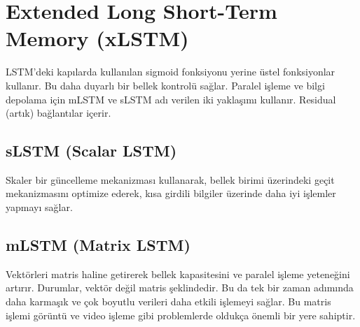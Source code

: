 \section{Extended Long Short-Term Memory (xLSTM)}
LSTM'deki kapılarda kullanılan sigmoid fonksiyonu yerine üstel fonksiyonlar kullanır. Bu daha duyarlı bir bellek kontrolü sağlar. Paralel işleme ve bilgi depolama için mLSTM ve sLSTM adı verilen iki yaklaşımı kullanır. Residual (artık) bağlantılar içerir.

\subsection{sLSTM (Scalar LSTM)}
Skaler bir güncelleme mekanizması kullanarak, bellek birimi üzerindeki geçit mekanizmasını optimize ederek, kısa girdili bilgiler üzerinde daha iyi işlemler yapmayı sağlar. 

\subsection{mLSTM (Matrix LSTM)}
Vektörleri matris haline getirerek bellek kapasitesini ve paralel işleme yeteneğini artırır. Durumlar, vektör değil matris şeklindedir. Bu da tek bir zaman adımında daha karmaşık ve çok boyutlu verileri daha etkili işlemeyi sağlar. Bu matris işlemi görüntü ve video işleme gibi problemlerde oldukça önemli bir yere sahiptir.

\newpage
